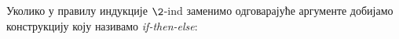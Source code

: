 \newpage%
Уколико у правилу индукције $\2$-ind заменимо одговарајуће аргументе добијамо конструкцију коју називамо \emph{if-then-else}:   
\begin{code}%
\>[0]%
\>[2278I]\AgdaSymbol{:}\AgdaSpace{}%
\AgdaSymbol{\{}\AgdaSpace{}%
\AgdaSymbol{:}\AgdaSpace{}%
\AgdaSpace{}%
\AgdaSpace{}%
\AgdaSpace{}%
\AgdaSpace{}%
\AgdaSymbol{\}}\<%
\\
\>[.][@{}l@{}]\<[2278I]%
\>[13]\AgdaSpace{}%
\AgdaSymbol{(}\AgdaSpace{}%
\AgdaSymbol{:}\AgdaSpace{}%
\AgdaSymbol{)}\<%
\\
%
\>[13]\AgdaSpace{}%
\AgdaSymbol{(}\AgdaSpace{}%
\AgdaSymbol{)}\<%
\\
%
\>[13]\AgdaSpace{}%
\AgdaSymbol{(}\AgdaSpace{}%
\AgdaSymbol{)}\<%
\\
%
\>[13]\AgdaSpace{}%
\AgdaSymbol{(}\AgdaSpace{}%
\AgdaSymbol{)}\<%
\\
\>[0]\AgdaSpace{}%
%
\>[9]\AgdaSpace{}%
\AgdaSpace{}%
\AgdaSpace{}%
\AgdaSpace{}%
\AgdaSymbol{=}\AgdaSpace{}%
\<%
\\
\>[0]\AgdaSpace{}%
\AgdaSpace{}%
\AgdaSpace{}%
\AgdaSpace{}%
\AgdaSpace{}%
\AgdaSpace{}%
\AgdaSymbol{=}\AgdaSpace{}%
\<%
\end{code}